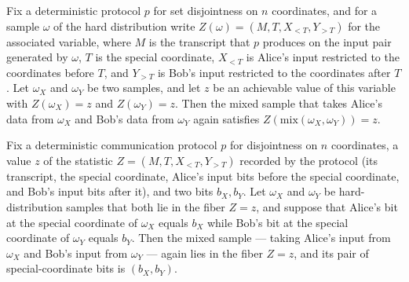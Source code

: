 \begin{theorem}
Fix a deterministic protocol $p$ for set disjointness on $n$ coordinates, and for a
sample $\omega$ of the hard distribution write $Z(\omega) = (M, T, X_{<T}, Y_{>T})$ for
the associated variable, where $M$ is the transcript that $p$ produces on the input pair
generated by $\omega$, $T$ is the special coordinate, $X_{<T}$ is Alice's input
restricted to the coordinates before $T$, and $Y_{>T}$ is Bob's input restricted to the
coordinates after $T$. Let $\omega_X$ and $\omega_Y$ be two samples, and let $z$ be an
achievable value of this variable with $Z(\omega_X) = z$ and $Z(\omega_Y) = z$. Then the
mixed sample that takes Alice's data from $\omega_X$ and Bob's data from $\omega_Y$
again satisfies $Z(\mathrm{mix}(\omega_X, \omega_Y)) = z$.
\end{theorem}

\begin{theorem}
\label{CommunicationComplexity.Functions.Disjointness.RandomizedLowerBound.mix_mem_fiber_inter_specialPair_of_mem_specialX_specialY}
\leanok
{}
Fix a deterministic communication protocol $p$ for disjointness on $n$ coordinates, a
value $z$ of the statistic $Z = (M, T, X_{<T}, Y_{>T})$ recorded by the protocol (its
transcript, the special coordinate, Alice's input bits before the special coordinate,
and Bob's input bits after it), and two bits $b_X, b_Y$. Let $\omega_X$ and $\omega_Y$
be hard-distribution samples that both lie in the fiber $Z = z$, and suppose that
Alice's bit at the special coordinate of $\omega_X$ equals $b_X$ while Bob's bit at the
special coordinate of $\omega_Y$ equals $b_Y$. Then the mixed sample — taking Alice's
input from $\omega_X$ and Bob's input from $\omega_Y$ — again lies in the fiber $Z = z$,
and its pair of special-coordinate bits is $(b_X, b_Y)$.
\end{theorem}

